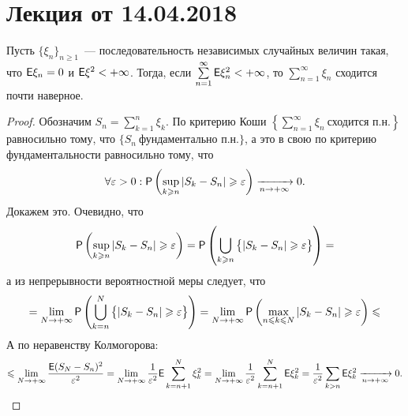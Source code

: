 \section{Лекция от 14.04.2018}
\begin{theorem}
	Пусть $\{\xi_n \}_{n \geqslant 1}$~--- последовательность независимых случайных величин такая, что $\E \xi_n = 0 $ и $\E \xi^2 < +\infty$. Тогда, если $\sum\limits_{n = 1}^{\infty} \E \xi_n^2 < +\infty$, то $ \sum\limits_{n = 1}^{\infty} \xi_n$ сходится почти наверное.
	\begin{proof}
		Обозначим $S_n = \sum\limits_{k=1}^n \xi_k$. По критерию Коши $\left\{ \sum\limits_{n = 1}^{\infty}\xi_n~\text{сходится п.н.} \right\}$ равносильно тому, что $\{ S_n~\text{фундаментально п.н.}\}$, а это в свою по критерию фундаментальности равносильно тому, что 
		$$\forall \varepsilon > 0: \P \left( \sup\limits_{k \geqslant n} | S_k - S_n | \geqslant \varepsilon \right) \limn 0.$$ Докажем это.
		 Очевидно, что
		 $$\P \left( \sup\limits_{k \geqslant n} | S_k - S_n | \geqslant \varepsilon \right) = \P \left( \bigcup\limits_{k \geqslant n} \big\{| S_k - S_n | \geqslant \varepsilon \big\} \right) =$$
		 а из непрерывности вероятностной меры следует, что 
		 $$= \lim\limits_{N \rightarrow +\infty} \P \left( \bigcup\limits_{k = n}^{N} \big\{| S_k - S_n | \geqslant \varepsilon \big\} \right) = \lim\limits_{N \rightarrow +\infty} \P \left( \max\limits_{n \leqslant k \leqslant N} | S_k - S_n | \geqslant \varepsilon \right) \leqslant$$
		 А по неравенству Колмогорова:
		 $$\leqslant \lim\limits_{N \rightarrow + \infty} \dfrac{\E ( S_N - S_n)^2}{\varepsilon^2} = \lim\limits_{N \rightarrow + \infty} \dfrac{1}{\varepsilon^2} \E \sum\limits_{k = n + 1}^N \xi_k^2 = \lim\limits_{N \rightarrow + \infty} \dfrac{1}{\varepsilon^2} \sum\limits_{k = n + 1}^N \E \xi_k^2 = \dfrac{1}{\varepsilon^2} \sum\limits_{k > n} \E \xi_k^2 \limn 0.$$
	\end{proof}
\end{theorem}
